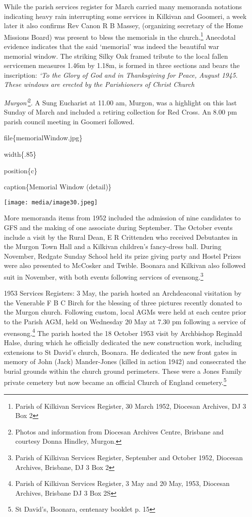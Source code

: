 While the parish services register for March carried many memoranda notations indicating heavy rain interrupting some services in Kilkivan and Goomeri, a week later it also confirms Rev Canon R B Massey, (organizing secretary of the Home Missions Board) was present to bless the memorials in the church.\footnote{Parish of Kilkivan Services Register, 30 March 1952, Diocesan Archives, DJ 3 Box 2} Anecdotal evidence indicates that the said `memorial' was indeed the beautiful war memorial window. The striking Silky Oak framed tribute to the local fallen servicemen measures 1.46m by 1.18m, is formed in three sections and bears the inscription: \emph{`To the Glory of God and in Thanksgiving for Peace, August 1945. These windows are erected by the Parishioners of Christ Church}

\emph{Murgon'}\footnote{Photos and information from Diocesan Archives Centre, Brisbane and courtesy Donna Hindley, Murgon.}. A Sung Eucharist at 11.00 am, Murgon, was a highlight on this last Sunday of March and included a retiring collection for Red Cross. An 8.00 pm parish council meeting in Goomeri followed.

file\{memorialWindow.jpg\}

width\{.85\}

position\{c\}

caption\{Memorial Window (detail)\}

\texttt{[image: media/image30.jpeg]}

More memoranda items from 1952 included the admission of nine candidates to GFS and the making of one associate during September. The October events include a visit by the Rural Dean, E R Crittenden who received Debutantes in the Murgon Town Hall and a Kilkivan children's fancy-dress ball. During November, Redgate Sunday School held its prize giving party and Hostel Prizes were also presented to McCosker and Twible. Boonara and Kilkivan also followed suit in November, with both events following services of evensong.\footnote{Parish of Kilkivan Services Register, September and October 1952, Diocesan Archives, Brisbane, DJ 3 Box 2}

1953 Services Registers: 3 May, the parish hosted an Archdeaconal visitation by the Venerable F B C Birch for the blessing of three pictures recently donated to the Murgon church. Following custom, local AGMs were held at each centre prior to the Parish AGM, held on Wednesday 20 May at 7.30 pm following a service of evensong.\footnote{Parish of Kilkivan Services Register, 3 May and 20 May, 1953, Diocesan Archives, Brisbane DJ 3 Box 2S} The parish hosted the 18 October 1953 visit by Archbishop Reginald Halse, during which he officially dedicated the new construction work, including extensions to St David's church, Boonara. He dedicated the new front gates in memory of John (Jack) Mander-Jones (killed in action 1942) and consecrated the burial grounds within the church ground perimeters. These were a Jones Family private cemetery but now became an official Church of England cemetery.\footnote{St David's, Boonara, centenary booklet p. 15}


